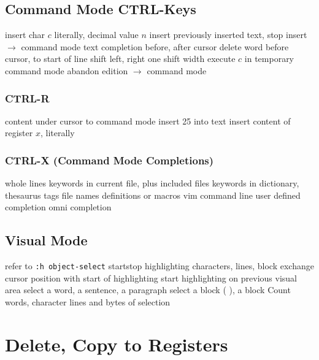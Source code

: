 \subsection{Command Mode CTRL-Keys}	{}
	{insert char $c$ literally, decimal value $n$}
	{insert previously inserted text, stop insert $\to$ command mode}
	{text completion before, after cursor}
	{delete word before cursor, to start of line}
	{shift left, right one shift width}
	{execute $c$ in temporary command mode}
	{abandon edition $\to$ command mode}
\subsubsection{CTRL-R}{}
	{content under cursor to command mode}
	{insert 25 into text}
	{insert content of register $x$, literally}
\subsubsection{CTRL-X (Command Mode Completions)}{}
	{whole lines}
	{keywords in current file, plus included files}
	{keywords in dictionary, thesaurus}
\cmdS{\ctrl{}X\ctrl{}]}	{tags}
	{file names}
	{definitions or macros}
	{vim command line}
	{user defined completion}
	{omni completion}

\subsection{Visual Mode}	{refer to {\tt :h object-select}}
	{start\or stop highlighting characters, lines, block}
	{exchange cursor position with start of highlighting}
	{start highlighting on previous visual area}
	{select a word, a sentence, a paragraph}
	{select a block ( ), a block {\tt\lapos}	{\tt\rapos}}
	{Count words, character lines and bytes of selection}

\section{Delete, Copy to Registers}	{}
